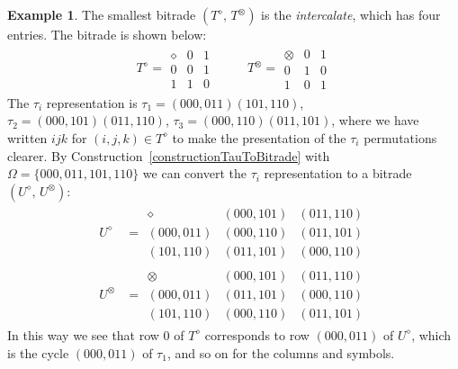 \documentclass[amstags,fleqn,reqno]{article}
\theoremstyle{plain}
\theoremstyle{definition}
\newtheorem{example}[theorem]{Example}
\newcommand{\darts}{\Omega\xspace}
\newcommand{\opa}{\diamond}
\newcommand{\opb}{\otimes}
\begin{document}
\begin{example}\label{exampleIntercalateRep}
The smallest bitrade $(T^{\opa},\, T^{\opb})$ is the {\em intercalate},
which has four entries. The bitrade is shown below:
\begin{align*}
T^{\opa} = \begin{array}{c|cccc}
\opa & 0 & 1 \\
\hline 
0 & 0 & 1 \\
1 & 1 & 0
\end{array}
& \quad & 
T^{\opb} = \begin{array}{c|cccc}
\opb & 0 & 1 \\
\hline 
0 & 1 & 0 \\
1 & 0 & 1
\end{array}
\end{align*}
The $\tau_i$ representation is
$\tau_1 = (000,011)(101,110)$, $\tau_2 = (000,101)(011,110)$,
$\tau_3 = (000,110)(011,101)$, 
where we have written $ijk$ for $(i,j,k) \in T^{\opa}$ to make
the presentation of the $\tau_i$ permutations clearer.
By Construction~\ref{constructionTauToBitrade}
with $\darts = \{ 000, 011, 101, 110 \}$
we can convert the $\tau_i$ representation to a bitrade 
$(U^{\opa},\, U^{\opb})$:
\begin{align*}
U^{\opa} &= \begin{array}{c|cccc}
\opa & (000,101) & (011,110) \\
\hline 
(000,011) & (000,110) & (011,101) \\
(101,110) & (011,101) & (000,110)
\end{array} \\
U^{\opb} &= \begin{array}{c|cccc}
\opb & (000,101) & (011,110) \\
\hline 
(000,011) & (011,101) & (000,110) \\
(101,110) & (000,110) & (011,101)
\end{array}
\end{align*}
In this way we see that row $0$ of $T^{\opa}$ corresponds to 
row $(000,011)$ of $U^{\opa}$, which is the cycle
$( 000,011 )$ of $\tau_1$, and so on for the columns and symbols.
\end{example}
\end{document}
